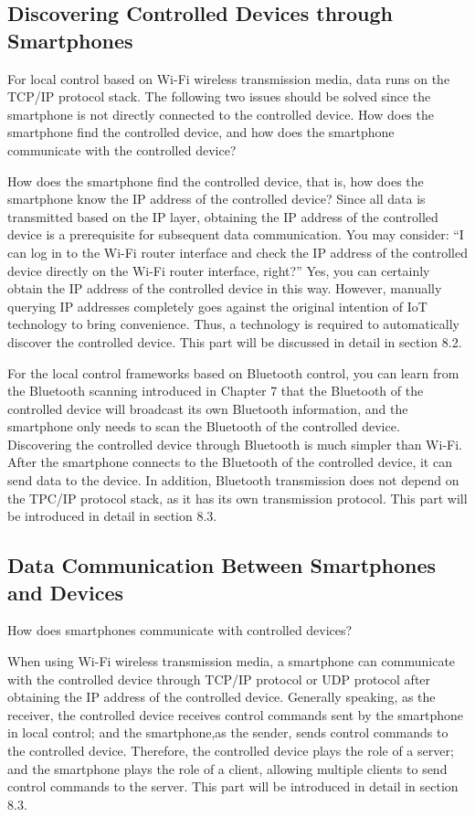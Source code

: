 \documentclass[a4paper,12pt]{book}
\begin{document}
\subsection{Discovering Controlled Devices through Smartphones}
For local control based on Wi-Fi wireless transmission media, data runs on the TCP/IP protocol stack. The following two issues should be solved since the smartphone is not directly connected to the controlled device. How does the smartphone find the controlled device, and how does the smartphone communicate with the controlled device?

How does the smartphone find the controlled device, that is, how does the smartphone know the IP address of the controlled device? Since all data is transmitted based on the IP layer, obtaining the IP address of the controlled device is a prerequisite for subsequent data communication. You may consider: “I can log in to the Wi-Fi router interface and check the IP address of the controlled device directly on the Wi-Fi router interface, right?” Yes, you can certainly obtain the IP address of the controlled device in this way. However, manually querying IP addresses completely goes against the original intention of IoT technology to bring convenience. Thus, a technology is required to automatically discover the controlled device. This part will be discussed in detail in section 8.2.

For the local control frameworks based on Bluetooth control, you can learn from the Bluetooth scanning introduced in Chapter 7 that the Bluetooth of the controlled device will broadcast its own Bluetooth information, and the smartphone only needs to scan the Bluetooth of the controlled device. Discovering the controlled device through Bluetooth is much simpler than Wi-Fi. After the smartphone connects to the Bluetooth of the controlled device, it can send data to the device. In addition, Bluetooth transmission does not depend on the TPC/IP protocol stack, as it has its own transmission protocol. This part will be introduced in detail in section 8.3.

\subsection{Data Communication Between Smartphones and Devices}
How does smartphones communicate with controlled devices?

When using Wi-Fi wireless transmission media, a smartphone can communicate with the controlled device through TCP/IP protocol or UDP protocol after obtaining the IP address of the controlled device. Generally speaking, as the receiver, the controlled device receives control commands sent by the smartphone in local control; and the smartphone,as the sender, sends control commands to the controlled device. Therefore, the controlled device plays the role of a server; and the smartphone plays the role of a client, allowing multiple clients to send control commands to the server. This part will be introduced in detail in section 8.3.
\end{document}
